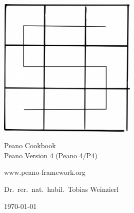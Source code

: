 
\begin{titlepage}

  \begin{center}

    \vspace{8cm}
  
    \includegraphics[width=0.5\textwidth]{../src/Peano-logo.png}
 
    \vspace{1.5cm}

    {\Huge
      Peano Cookbook
    }
    \\
    Peano Version 4 (Peano 4/P4)
   
    \vspace{1cm}

     www.peano-framework.org
     
    \vspace{1.5cm}

     Dr.~rer.~nat.~habil.~Tobias Weinzierl
 
    \vspace{1.5cm}

    \today
  \end{center}


\end{titlepage}
